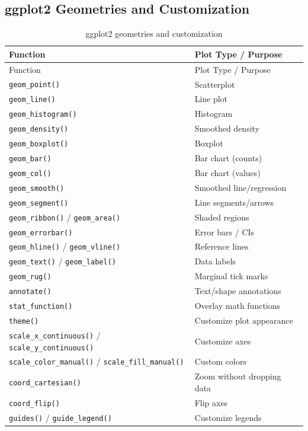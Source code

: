 \documentclass[
  letterpaper,
  DIV=11,
  numbers=noendperiod]{scrreprt}
\begin{document}
\subsection{ggplot2 Geometries and
Customization}\label{ggplot2-geometries-and-customization}

\begin{longtable}[]{@{}ll@{}}
\caption{ggplot2 geometries and
customization}\label{tbl-ggplot-ref}\tabularnewline
\toprule\noalign{}
Function & Plot Type / Purpose \\
\midrule\noalign{}
\endfirsthead
\toprule\noalign{}
Function & Plot Type / Purpose \\
\midrule\noalign{}
\endhead
\bottomrule\noalign{}
\endlastfoot
\texttt{geom\_point()} & Scatterplot \\
\texttt{geom\_line()} & Line plot \\
\texttt{geom\_histogram()} & Histogram \\
\texttt{geom\_density()} & Smoothed density \\
\texttt{geom\_boxplot()} & Boxplot \\
\texttt{geom\_bar()} & Bar chart (counts) \\
\texttt{geom\_col()} & Bar chart (values) \\
\texttt{geom\_smooth()} & Smoothed line/regression \\
\texttt{geom\_segment()} & Line segments/arrows \\
\texttt{geom\_ribbon()} / \texttt{geom\_area()} & Shaded regions \\
\texttt{geom\_errorbar()} & Error bars / CIs \\
\texttt{geom\_hline()} / \texttt{geom\_vline()} & Reference lines \\
\texttt{geom\_text()} / \texttt{geom\_label()} & Data labels \\
\texttt{geom\_rug()} & Marginal tick marks \\
\texttt{annotate()} & Text/shape annotations \\
\texttt{stat\_function()} & Overlay math functions \\
\texttt{theme()} & Customize plot appearance \\
\texttt{scale\_x\_continuous()} / \texttt{scale\_y\_continuous()} &
Customize axes \\
\texttt{scale\_color\_manual()} / \texttt{scale\_fill\_manual()} &
Custom colors \\
\texttt{coord\_cartesian()} & Zoom without dropping data \\
\texttt{coord\_flip()} & Flip axes \\
\texttt{guides()} / \texttt{guide\_legend()} & Customize legends \\
\end{longtable}
\end{document}
